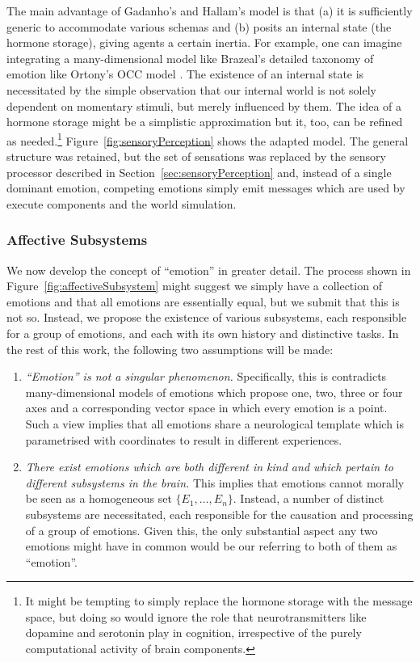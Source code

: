 \pagebreak
The main advantage of Gadanho's and Hallam's model is that (a) it is sufficiently generic to accommodate various schemas and (b) posits an internal state (the hormone storage), giving agents a certain inertia. For example, one can imagine integrating a many-dimensional model like Brazeal's \cite{breazeal2003} detailed taxonomy of emotion like Ortony's OCC model \cite{ortony1988}. The existence of an internal state is necessitated by the simple observation that our internal world is not solely dependent on momentary stimuli, but merely influenced by them. The idea of a hormone storage might be a simplistic approximation but it, too, can be refined as needed.\footnote{It might be tempting to simply replace the hormone storage with the message space, but doing so would ignore the role that neurotransmitters like dopamine and serotonin play in cognition, irrespective of the purely computational activity of brain components.} Figure~\ref{fig:sensoryPerception} shows the adapted model. The general structure was retained, but the set of sensations was replaced by the sensory processor described in Section~\ref{sec:sensoryPerception} and, instead of a single dominant emotion, competing emotions simply emit messages which are used by execute components and the world simulation.

\subsubsection{Affective Subsystems}

We now develop the concept of ``emotion'' in greater detail. The process shown in Figure~\ref{fig:affectiveSubsystem} might suggest we simply have a collection of emotions and that all emotions are essentially equal, but we submit that this is not so. Instead, we propose the existence of various subsystems, each responsible for a group of emotions, and each with its own history and distinctive tasks. In the rest of this work, the following two assumptions will be made:

\begin{enumerate}
	\item {\em ``Emotion'' is not a singular phenomenon.} Specifically, this is contradicts many-dimensional models of emotions which propose one, two, three or four axes and a corresponding vector space in which every emotion is a point. Such a view implies that all emotions share a neurological template which is parametrised with coordinates to result in different experiences.
	\item {\em There exist emotions which are both different in kind and which pertain to different subsystems in the brain.} This implies that emotions cannot morally be seen as a homogeneous set $\{E_1,\dots,E_n\}$. Instead, a number of distinct subsystems are necessitated, each responsible for the causation and processing of a group of emotions. Given this, the only substantial aspect any two emotions might have in common would be our referring to both of them as ``emotion''.
\end{enumerate}


